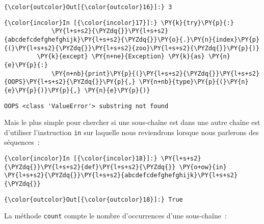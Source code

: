 \begin{Verbatim}[commandchars=\\\{\},frame=single,framerule=0.3mm,rulecolor=\color{cellframecolor}]
{\color{outcolor}Out[{\color{outcolor}16}]:} 3
\end{Verbatim}
            
    \begin{Verbatim}[commandchars=\\\{\},frame=single,framerule=0.3mm,rulecolor=\color{cellframecolor}]
{\color{incolor}In [{\color{incolor}17}]:} \PY{k}{try}\PY{p}{:}
             \PY{l+s+s2}{\PYZdq{}}\PY{l+s+s2}{abcdefcdefghefghijk}\PY{l+s+s2}{\PYZdq{}}\PY{o}{.}\PY{n}{index}\PY{p}{(}\PY{l+s+s2}{\PYZdq{}}\PY{l+s+s2}{zoo}\PY{l+s+s2}{\PYZdq{}}\PY{p}{)}
         \PY{k}{except} \PY{n+ne}{Exception} \PY{k}{as} \PY{n}{e}\PY{p}{:}
             \PY{n+nb}{print}\PY{p}{(}\PY{l+s+s2}{\PYZdq{}}\PY{l+s+s2}{OOPS}\PY{l+s+s2}{\PYZdq{}}\PY{p}{,} \PY{n+nb}{type}\PY{p}{(}\PY{n}{e}\PY{p}{)}\PY{p}{,} \PY{n}{e}\PY{p}{)}
\end{Verbatim}


    \begin{Verbatim}[commandchars=\\\{\},frame=single,framerule=0.3mm,rulecolor=\color{cellframecolor}]
OOPS <class 'ValueError'> substring not found
\end{Verbatim}

    Mais le plus simple pour chercher si une sous-chaîne est dans une autre
chaîne est d'utiliser l'instruction \texttt{in} sur laquelle nous
reviendrons lorsque nous parlerons des séquences~:

    \begin{Verbatim}[commandchars=\\\{\},frame=single,framerule=0.3mm,rulecolor=\color{cellframecolor}]
{\color{incolor}In [{\color{incolor}18}]:} \PY{l+s+s2}{\PYZdq{}}\PY{l+s+s2}{def}\PY{l+s+s2}{\PYZdq{}} \PY{o+ow}{in} \PY{l+s+s2}{\PYZdq{}}\PY{l+s+s2}{abcdefcdefghefghijk}\PY{l+s+s2}{\PYZdq{}}
\end{Verbatim}


\begin{Verbatim}[commandchars=\\\{\},frame=single,framerule=0.3mm,rulecolor=\color{cellframecolor}]
{\color{outcolor}Out[{\color{outcolor}18}]:} True
\end{Verbatim}
            
    La méthode \texttt{count} compte le nombre d'occurrences d'une
sous-chaîne~:

